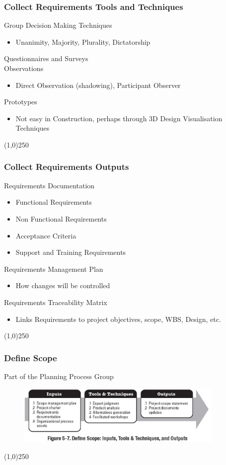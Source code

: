 \begin{frame}
\frametitle{Collect Requirements \hfill Tools and Techniques}
Group Decision Making Techniques
\begin{itemize}
	\item Unanimity, Majority, Plurality, Dictatorship
\end{itemize}
Questionnaires and Surveys\\
Observations
\begin{itemize}
	\item Direct Observation (shadowing), Participant Observer
\end{itemize}
Prototypes
\begin{itemize}
	\item Not easy in Construction, perhaps through 3D Design Visualisation Techniques
\end{itemize}
\end{frame}\begin{center}\line(1,0){250}\end{center}



\begin{frame}
\frametitle{Collect Requirements \hfill Outputs}
Requirements Documentation
\begin{itemize}
	\item Functional Requirements
	\item Non Functional Requirements
	\item Acceptance Criteria
	\item Support and Training Requirements
\end{itemize}
Requirements Management Plan
\begin{itemize}
	\item How changes will be controlled
\end{itemize}
Requirements Traceability Matrix
\begin{itemize}
	\item Links Requirements to project objectives, scope, WBS, Design, etc.
\end{itemize}
\end{frame}\begin{center}\line(1,0){250}\end{center}



\begin{frame}
\frametitle{Define Scope}{Part of the Planning Process Group}
\begin{figure}
	\centering
		\includegraphics[width = 10cm]{images/Fig5-7.jpg}
	\label{fig:5-7}
\end{figure}
\end{frame}\begin{center}\line(1,0){250}\end{center}



